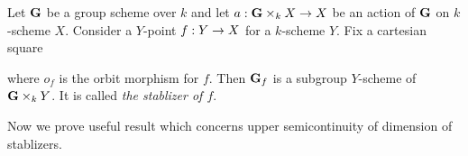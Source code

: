 \begin{definition}
Let $\mathbf{G}$ be a group scheme over $k$ and let $a:\mathbf{G}\times_k X\rightarrow X$ be an action of $\mathbf{G}$ on $k$-scheme $X$. Consider a $Y$-point $f:Y\rightarrow X$ for a $k$-scheme $Y$. Fix a cartesian square
\begin{center}
\end{center}
where $o_f$ is the orbit morphism for $f$. Then $\mathbf{G}_f$ is a subgroup $Y$-scheme of $\mathbf{G}\times_kY$. It is called \textit{the stablizer of $f$}.
\end{definition}
\noindent
Now we prove useful result which concerns upper semicontinuity of dimension of stablizers.

